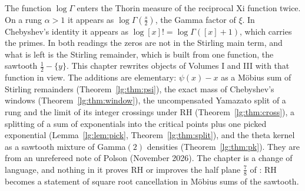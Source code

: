 \label{lg:ch:logg}
The function $\log\Gamma$ enters the Thorin measure of the reciprocal Xi function twice. On a rung $\alpha>1$ it appears as $\log\Gamma(\frac s2)$, the Gamma factor of $\xi$. In Chebyshev's identity it appears as $\log[x]!=\log\Gamma([x]+1)$, which carries the primes. In both readings the zeros are not in the Stirling main term, and what is left is the Stirling remainder, which is built from one function, the sawtooth $\frac12-\{y\}$. This chapter rewrites objects of Volumes I and III with that function in view. The additions are elementary: $\psi(x)-x$ as a Möbius sum of Stirling remainders (Theorem~\ref{lg:thm:psi}), the exact mass of Chebyshev's windows (Theorem~\ref{lg:thm:window}), the uncompensated Yamazato split of a rung and the limit of its integer crossings under RH (Theorem~\ref{lg:thm:cross}), a splitting of a sum of exponentials into the critical points plus one picked exponential (Lemma~\ref{lg:lem:pick}, Theorem~\ref{lg:thm:split}), and the theta kernel as a sawtooth mixture of Gamma$(2)$ densities (Theorem~\ref{lg:thm:pk}). They are from an unrefereed note of Polson (November 2026). The chapter is a change of language, and nothing in it proves RH or improves the half plane $\frac78$ of \cite{OAI26a}: RH becomes a statement of square root cancellation in Möbius sums of the sawtooth.


